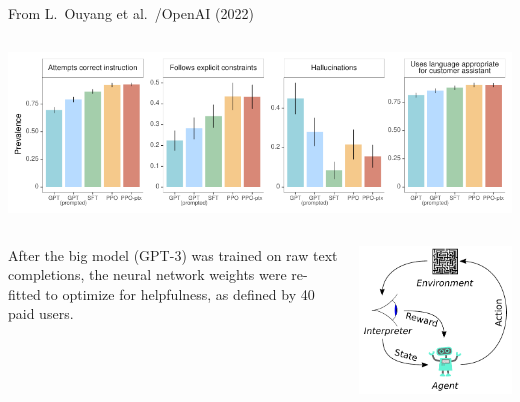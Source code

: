\documentclass[aspectratio=169]{beamer}
\begin{document}
\begin{frame}{From L.\ Ouyang et al.\ /OpenAI (2022)}
\large
\vspace{0.4 cm}
\begin{columns}
\includegraphics[width=\linewidth]{fine-tuning-for-chat-results.pdf}
\end{columns}

\vspace{0.2 cm}
\begin{columns}
After the big model (GPT-3) was trained on raw text completions, the neural network weights were re-fitted to optimize for helpfulness, as defined by 40 paid users.

\includegraphics[width=\linewidth]{Reinforcement_learning_diagram.pdf}
\end{columns}
\end{frame}
\end{document}
